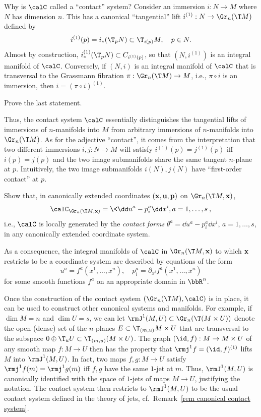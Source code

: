 Why is $\calC$ called a ``contact'' system? Consider an immersion $i:N\to M$ where $N$ has dimension $n$. This has a canonical ``tangential'' lift $i^{(1)}:N\to \Gr_n(\T M)$ defined by 
\[i^{(1)}(p)=i_\ast(\T_p N)\subset \T_{i(p)}M,\quad p\in N.\]
Almost by construction, $i_\ast^{(1)}(\T_p N)\subset C_{i^{(1)}(p)}$, so that $(N,i^{(1)})$ is an integral manifold of $\calC$. Conversely, if $(N,i)$ is an integral manifold of $\calC$ that is transversal to the Grassmann fibration $\pi:\Gr_n(\T M)\to M$, i.e., $\pi\circ i$ is an immersion, then $i=(\pi\circ i)^{(1)}$.

\begin{xca}
    Prove the last statement.
\end{xca}

Thus, the contact system $\calC$ essentially distinguishes the tangential lifts of immersions of $n$-manifolds into $M$ from arbitrary immersions of $n$-manifolds into $\Gr_n(\T M)$. As for the adjective ``contact'', it comes from the interpretation that two different immersions $i,j:N\to M$ will satisfy $i^{(1)}(p)=j^{(1)}(p)$ iff $i(p)=j(p)$ and the two image submanifolds share the same tangent $n$-plane at $p$. Intuitively, the two image submanifolds $i(N), j(N)$ have ``first-order contact'' at $p$.

\begin{xca}
    Show that, in canonically extended coordinates $(\bf{x},\bf{u},\bf{p})$ on $\Gr_n(\T M,\bf{x})$, 
    \[\calC_{\Gr_n(\T M,\bf{x})}=\<\dd u^a-p^a_i\dd x^i,a=1,\ldots,s\>,\]
    i.e., $\calC$ is locally generated by the \emph{contact forms} $\theta^a=\dd u^a-p^a_i\dd x^i$, $a=1,\ldots,s$, in any canonically extended coordinate system.
\end{xca}

As a consequence, the integral manifolds of $\calC$ in $\Gr_n(\T M,\bf{x})$ to which $\bf{x}$ restricts to be a coordinate system are described by equations of the form 
\[u^a=f^a(x^1,\ldots,x^n),\quad p^a_i=\partial_{x^i}f^a(x^1,\ldots,x^n)\]
for some smooth functions $f^a$ on an appropriate domain in $\bbR^n$.

Once the construction of the contact system $(\Gr_n(\T M),\calC)$ is in place, it can be used to construct other canonical systems and manifolds. For example, if $\dim M=n$ and $\dim U=s$, we can let $\rmJ^1(M,U)\subset\Gr_n(\T (M\times U))$ denote the open (dense) set of the $n$-planes $E\subset\T_{(m,u)}M\times U$ that are transversal to the subspace $0\oplus \T_u U\subset\T_{(m,u)}(M\times U)$. The graph $(\id,f):M\to M\times U$ of any smooth map $f:M\to U$ then has the property that $\rmj^1 f=(\id,f)^{(1)}$ lifts $M$ into $\rmJ^1(M,U)$. In fact, two maps $f,g:M\to U$ satisfy $\rmj^1 f(m)=\rmj^1 g(m)$ iff $f,g$ have the same $1$-jet at $m$. Thus, $\rmJ^1(M,U)$ is canonically identified with the space of $1$-jets of maps $M\to U$, justifying the notation. The contact system then restricts to $\rmJ^1(M,U)$ to be the usual contact system defined in the theory of jets, cf.\ Remark~\ref{rem canonical contact system}.


